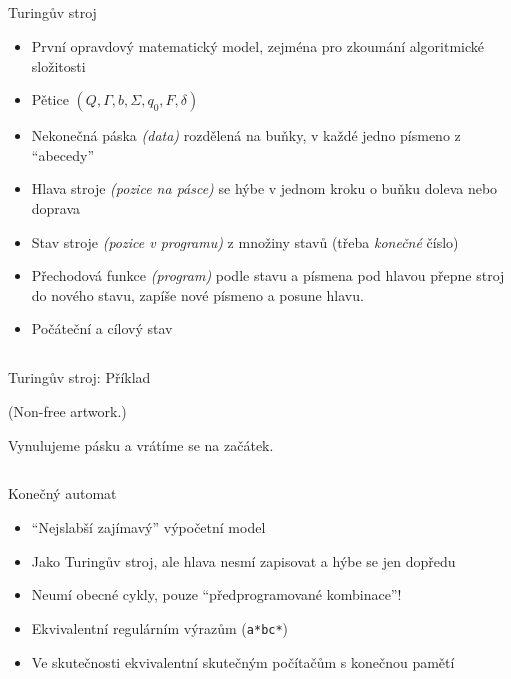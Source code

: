 \documentclass{beamer}
\begin{document}
\subsection{}
\begin{frame}{Turingův stroj}
\begin{itemize}
\item První opravdový matematický model, zejména pro zkoumání algoritmické složitosti
\item Pětice $(Q, \Gamma, b, \Sigma, q_0, F, \delta)$
\item Nekonečná páska {\em (data)} rozdělená na buňky, v každé jedno písmeno z ``abecedy''
\item Hlava stroje {\em (pozice na pásce)} se hýbe v jednom kroku o buňku doleva nebo doprava
\item Stav stroje {\em (pozice v programu)} z množiny stavů (třeba {\em konečné} číslo)
\item Přechodová funkce {\em (program)} podle stavu a písmena pod hlavou přepne stroj do nového stavu, zapíše nové písmeno a posune hlavu.
\item Počáteční a cílový stav
\end{itemize}
\end{frame}

\subsection{}
\begin{frame}{Turingův stroj: Příklad}
\begin{center}
(Non-free artwork.)

Vynulujeme pásku a vrátíme se na začátek.
\end{center}
\end{frame}

\subsection{}
\begin{frame}{Konečný automat}
\begin{itemize}
\item ``Nejslabší zajímavý'' výpočetní model
\item Jako Turingův stroj, ale hlava nesmí zapisovat a hýbe se jen dopředu
\pause
\item Neumí obecné cykly, pouze ``předprogramované kombinace''!
\item Ekvivalentní regulárním výrazům ({\tt a*bc*})
\pause
\item Ve skutečnosti ekvivalentní skutečným počítačům s konečnou pamětí
\end{itemize}
\end{frame}
\end{document}

